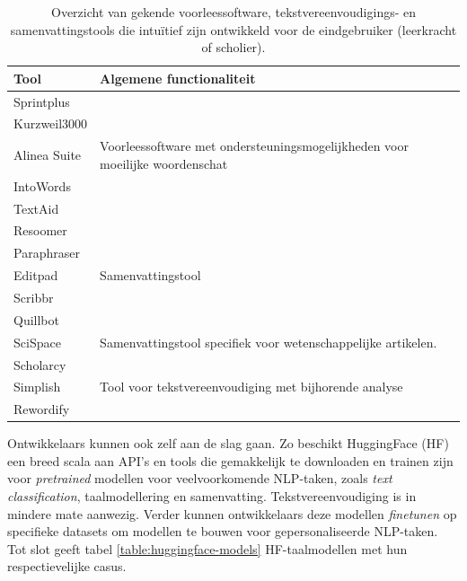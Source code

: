 \begin{center}
	\begin{table}[H]
		\begin{tabular}{ | m{4cm} | m{12cm} | } 
		\hline
		\textbf{Tool} & \textbf{Algemene functionaliteit} \\
		\hline
		Sprintplus & \\
		Kurzweil3000 & \\
		Alinea Suite & Voorleessoftware met ondersteuningsmogelijkheden voor moeilijke woordenschat \\
		IntoWords & \\
		TextAid & \\
		\hline
		Resoomer &  \\
		Paraphraser & \\
		Editpad & Samenvattingstool \\
		Scribbr & \\
		Quillbot & \\
		\hline
		SciSpace & Samenvattingstool specifiek voor wetenschappelijke artikelen. \\
		Scholarcy & \\
		\hline
		Simplish & Tool voor tekstvereenvoudiging met bijhorende analyse\\
		Rewordify & \\
		\hline
		\end{tabular}
	\caption{Overzicht van gekende voorleessoftware, tekstvereenvoudigings- en samenvattingstools die intuïtief zijn ontwikkeld voor de eindgebruiker (leerkracht of scholier).}
	\label{table:overview-tools}
	\end{table}
\end{center}

\medspace

Ontwikkelaars kunnen ook zelf aan de slag gaan. Zo beschikt HuggingFace (HF) een breed scala aan API's en tools die gemakkelijk te downloaden en trainen zijn voor \textit{pretrained} modellen voor veelvoorkomende NLP-taken, zoals \textit{text classification}, taalmodellering en samenvatting. Tekstvereenvoudiging is in mindere mate aanwezig. Verder kunnen ontwikkelaars deze modellen \textit{finetunen} op specifieke datasets om modellen te bouwen voor gepersonaliseerde NLP-taken. Tot slot geeft tabel \ref{table:huggingface-models} HF-taalmodellen met hun respectievelijke casus.

\medspace


